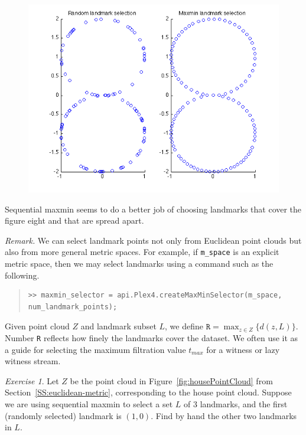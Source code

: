 \documentclass[amscd, amssymb, verbatim]{amsart}[12pt]
\theoremstyle{remark}
\newtheorem{exercise}{Exercise}
\theoremstyle{remark}
\theoremstyle{remark}
\begin{document}
\begin{figure}[htp]
  	\begin{center}
    	\includegraphics[width=5in]{fig8lands}
   	\end{center}
\end{figure}
\FloatBarrier

Sequential maxmin seems to do a better job of choosing landmarks that cover the figure eight and that are spread apart. 

{\em Remark.} We can select landmark points not only from Euclidean point clouds but also from more general metric spaces. For example, if \texttt{m\_space} is an explicit metric space, then we may select landmarks using a command such as the following.

\begin{quote} \begin{verbatim}
>> maxmin_selector = api.Plex4.createMaxMinSelector(m_space, num_landmark_points); 
\end{verbatim} \end{quote}

Given point cloud $Z$ and landmark subset $L$, we define $\texttt{R} = \max_{z\in Z}\bigl\{d(z,L)\bigr\}$. Number \texttt{R} reflects how finely the landmarks cover the dataset. We often use it as a guide for selecting the maximum filtration value $t_{max}$ for a witness or lazy witness stream. 

\begin{exercise}
Let $Z$ be the point cloud in Figure~\ref{fig:housePointCloud} from Section~\ref{SS:euclidean-metric}, corresponding to the house point cloud. Suppose we are using sequential maxmin to select a set $L$ of 3 landmarks, and the first (randomly selected) landmark is $(1,0)$. Find by hand the other two landmarks in $L$. 
\end{exercise}
\end{document}
